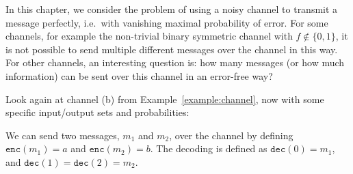 \newcommand{\enc}[1]{\mathtt{enc}(#1)}
\newcommand{\dec}[1]{\mathtt{dec}(#1)}

In this chapter, we consider the problem of using a noisy channel to transmit a message perfectly, i.e.\ with vanishing maximal probability of error. For some channels, for example the non-trivial binary symmetric channel with $f \not\in \{0,1\}$, it is not possible to send multiple different messages over the channel in this way. For other channels, an interesting question is: how many messages (or how much information) can be sent over this channel in an error-free way?

\begin{example}
Look again at channel (b) from Example~\ref{example:channel}, now with some specific input/output sets and probabilities:
\begin{center}
\end{center}
We can send two messages, $m_1$ and $m_2$, over the channel by defining $\enc{m_1} = a$ and $\enc{m_2} = b$. The decoding is defined as $\dec{0} = m_1$, and $\dec{1} = \dec{2} = m_2$.
\end{example}



